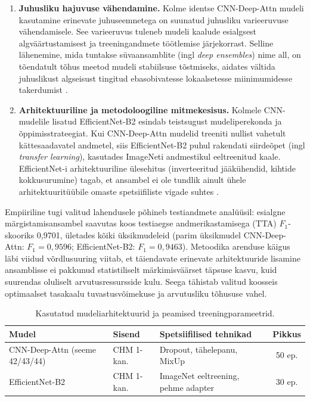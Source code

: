     \begin{enumerate}
        \item \textbf{Juhusliku hajuvuse vähendamine.} Kolme identse CNN-Deep-Attn mudeli kasutamine erinevate juhuseemnetega on suunatud juhusliku varieeruvuse vähendamisele. See varieeruvus tuleneb mudeli kaalude esialgsest algväärtustamisest ja treeningandmete töötlemise järjekorrast. Selline lähenemine, mida tuntakse süvaansamblite (ingl \textit{deep ensembles}) nime all, on tõendatult tõhus meetod mudeli stabiilsuse tõstmiseks, aidates vältida juhuslikust algseisust tingitud ebasobivatesse lokaalsetesse miinimumidesse takerdumist \parencite{lakshminarayanan_simple_2016}.

        \item \textbf{Arhitektuuriline ja metodoloogiline mitmekesisus.} Kolmele CNN-mudelile lisatud EfficientNet-B2 esindab teistsugust mudeliperekonda ja õppimisstrateegiat. Kui CNN-Deep-Attn mudelid treeniti nullist vahetult kättesaadavatel andmetel, siis EfficientNet-B2 puhul rakendati siirdeõpet (ingl \textit{transfer learning}), kasutades ImageNeti andmestikul eeltreenitud kaale. EfficientNet-i arhitektuuriline ülesehitus (inverteeritud jääkühendid, kihtide kokkusurumine) tagab, et ansambel ei ole tundlik ainult ühele arhitektuuritüübile omaste spetsiifiliste vigade suhtes \parencite{tan_efficientnet_2019}.
    \end{enumerate}

    Empiiriline tugi valitud lahendusele põhineb testiandmete analüüsil: esialgne märgistamisansambel saavutas koos testiaegse andmerikastamisega (TTA) $F_{1}$-skooriks 0,9701, ületades kõiki üksikmudeleid (parim üksikmudel CNN-Deep-Attn: $F_{1} = 0,9596$; EfficientNet-B2: $F_{1} = 0,9463$). Metoodika arenduse käigus läbi viidud võrdlusuuring viitab, et täiendavate erinevate arhitektuuride lisamine ansamblisse ei pakkunud statistiliselt märkimisväärset täpsuse kasvu, kuid suurendas oluliselt arvutusressursside kulu. Seega tähistab valitud koosseis optimaalset tasakaalu tuvastusvõimekuse ja arvutusliku tõhususe vahel.

    \begin{table}[h!]
    \centering
    \small
    \setlength{\tabcolsep}{5pt}
    \caption{Kasutatud mudeliarhitektuurid ja peamised treeningparameetrid.}
    \label{tab:model-architectures}
    \begin{tabular}{l|l|p{4.5cm}|c}
    \hline
    \textbf{Mudel} & \textbf{Sisend} & \textbf{Spetsiifilised tehnikad} & \textbf{Pikkus} \\
    \hline
    CNN-Deep-Attn (seeme 42/43/44) & CHM 1-kan. & Dropout, tähelepanu, MixUp & 50 ep. \\
    EfficientNet-B2 & CHM 1-kan. & ImageNet eeltreening, pehme adapter & 30 ep. \\
    \hline
    \end{tabular}
    \end{table}


